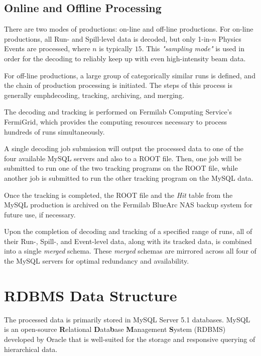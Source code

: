 
\subsection{Online and Offline Processing}

There are two modes of productions: on-line and off-line productions. For on-line productions, all Run- and Spill-level data is decoded, but only 1-in-$n$ Physics Events are processed, where $n$ is typically $15$. This \emph{"sampling mode"} is used in order for the decoding to reliably keep up with even high-intensity beam data.

For off-line productions, a large group of categorically similar runs is defined, and the chain of production processing is initiated. The steps of this process is generally emph{decoding, tracking, archiving, and merging}.

The decoding and tracking is performed on Fermilab Computing Service's FermiGrid, which provides the computing resources necessary to process hundreds of runs simultaneously.

A single decoding job submission will output the processed data to one of the four available MySQL servers and also to a ROOT file. Then, one job will be submitted to run one of the two tracking programs on the ROOT file, while another job is submitted to run the other tracking program on the MySQL data.

Once the tracking is completed, the ROOT file and the \emph{Hit} table from the MySQL production is archived on the Fermilab BlueArc NAS backup system for future use, if necessary.

Upon the completion of decoding and tracking of a specified range of runs, all of their Run-, Spill-, and Event-level data, along with its tracked data, is combined into a single \emph{merged} schema. These \emph{merged} schemas are mirrored across all four of the MySQL servers for optimal redundancy and availability.

\section{RDBMS Data Structure}

The processed data is primarily stored in MySQL Server 5.1 databases. MySQL is an open-source \textbf{R}elational \textbf{D}ata\textbf{b}ase \textbf{M}anagement \textbf{S}ystem (RDBMS) developed by Oracle that is well-suited for the storage and responsive querying of hierarchical data.

